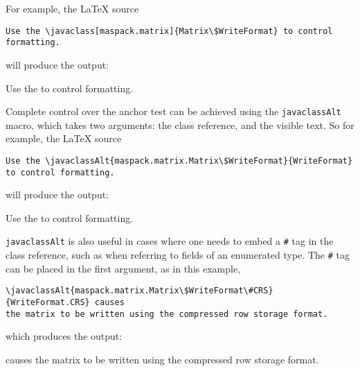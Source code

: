 \documentclass{article}
\begin{document}
For example, the LaTeX source 

\begin{lstlisting}[]
Use the \javaclass[maspack.matrix]{Matrix\$WriteFormat} to control formatting.
\end{lstlisting}

will produce the output:

Use the  to control formatting.

Complete control over the anchor test can be
achieved using the {\tt \BKS javaclassAlt} macro, which takes two
arguments: the class reference, and the visible text. So for example,
the LaTeX source

\begin{lstlisting}[]
Use the \javaclassAlt{maspack.matrix.Matrix\$WriteFormat}{WriteFormat}
to control formatting.
\end{lstlisting}

will produce the output:

Use the 
to control formatting.

{\tt \BKS javaclassAlt} is also useful in cases where one needs to
embed a {\tt \#} tag in the class reference, such as when referring to
fields of an enumerated type. The {\tt \#} tag can be placed
in the first argument, as in this example,

\begin{lstlisting}[]
\javaclassAlt{maspack.matrix.Matrix\$WriteFormat\#CRS}{WriteFormat.CRS} causes
the matrix to be written using the compressed row storage format.
\end{lstlisting}

which produces the output:

 causes
the matrix to be written using the compressed row storage format.

%
%
%
\end{document}
